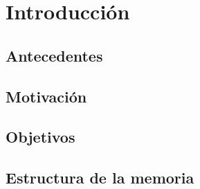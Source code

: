 \chapter{Introducción}


\section{Antecedentes}


\section{Motivación}


\section{Objetivos}


\section{Estructura de la memoria}


